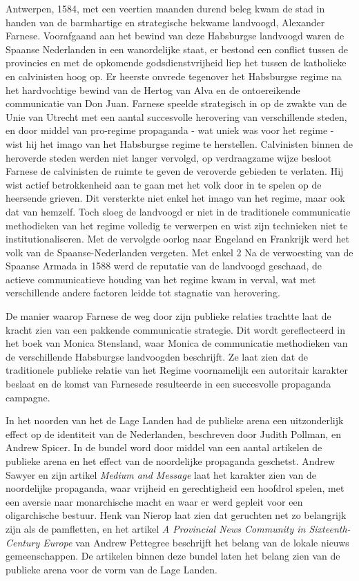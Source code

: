 \documentclass[11pt]{amsart}
\begin{document}
\noindent Antwerpen, 1584, met een veertien maanden durend beleg kwam de stad in handen van de barmhartige en
strategische bekwame landvoogd, Alexander Farnese. Voorafgaand aan het bewind van deze Habsburgse landvoogd waren de
Spaanse Nederlanden in een wanordelijke staat, er bestond een conflict tussen de provincies en met de opkomende
godsdienstvrijheid liep het tussen de katholieke en calvinisten hoog op. Er heerste
onvrede tegenover het Habsburgse regime na het hardvochtige bewind van de Hertog van Alva en de ontoereikende communicatie van Don Juan.
Farnese speelde strategisch in op de zwakte van de Unie van Utrecht met een
aantal succesvolle herovering van verschillende steden, en door middel van pro-regime propaganda - wat uniek was voor
het regime - wist hij het imago van het Habsburgse regime te herstellen. Calvinisten binnen de heroverde steden werden
niet langer vervolgd, op verdraagzame wijze besloot Farnese de calvinisten de ruimte te geven de veroverde gebieden te verlaten.
Hij wist actief betrokkenheid aan te gaan met het volk door in te spelen op de heersende grieven. Dit versterkte niet
enkel het imago van het regime, maar ook dat van hemzelf. Toch sloeg de landvoogd er niet in de traditionele communicatie
methodieken van het regime volledig te verwerpen en wist zijn technieken niet te institutionaliseren.
Met de vervolgde oorlog naar Engeland en Frankrijk werd het volk van de Spaanse-Nederlanden vergeten. Met enkel 2
Na de verwoesting van de Spaanse Armada in 1588 werd de reputatie van de landvoogd geschaad, de actieve communicatieve houding van het regime kwam in verval,
wat met verschillende andere factoren leidde tot stagnatie van herovering.

De manier waarop Farnese de weg door zijn publieke relaties trachtte laat de kracht zien van een pakkende communicatie
strategie. Dit wordt gereflecteerd in het boek van Monica Stensland, waar Monica de communicatie methodieken van de
verschillende Habsburgse landvoogden beschrijft. Ze laat zien dat de traditionele publieke relatie van het Regime
voornamelijk een autoritair karakter beslaat en de komst van Farnesede resulteerde in een succesvolle propaganda
campagne\autocite{stenslandHabsburgCommunicationDutch2012}.

In het noorden van het de Lage Landen had de publieke arena een uitzonderlijk effect op de identiteit van de
Nederlanden, beschreven door Judith Pollman, en Andrew Spicer\autocite{pollmannPublicOpinionChanging2007}. In de bundel
word door middel van een aantal artikelen de publieke arena en het effect van de noordelijke propaganda geschetst.
Andrew Sawyer en zijn artikel \textit{Medium and Message} laat het karakter zien van de noordelijke propaganda, waar
vrijheid en gerechtigheid een hoofdrol spelen, met een aversie naar monarchische macht en waar er werd gepleit voor een
oligarchische bestuur. Henk van Nierop\autocite{vannieropYeShallHear2007} laat zien dat geruchten net zo belangrijk
zijn als de pamfletten, en het artikel \textit{A Provincial News Community in Sixteenth-Century Europe} van Andrew
Pettegree\autocite{pettegreeProvincialNewsCommunity2007} beschrijft het belang van de lokale nieuws gemeenschappen. De
artikelen binnen deze bundel laten het belang zien van de publieke arena voor de vorm van de Lage Landen.
\end{document}

